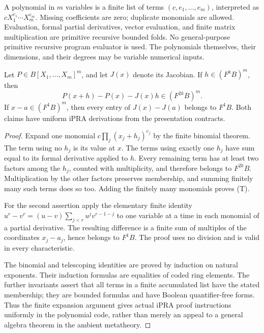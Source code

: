 A polynomial in $m$ variables is a finite list of terms
$(c,e_1,\ldots,e_m)$, interpreted as
$cX_1^{e_1}\cdots X_m^{e_m}$.  Missing coefficients are zero; duplicate
monomials are allowed.  Evaluation, formal partial derivatives, vector
evaluation, and finite matrix multiplication are primitive recursive
bounded folds.  No general-purpose primitive recursive program evaluator
is used.  The polynomials themselves, their dimensions, and their degrees
may be variable numerical inputs.

\begin{lemma}
\label{lem:filtered-taylor}
Let $P\in B[X_1,\ldots,X_m]^m$, and let $J(x)$ denote its Jacobian.
If $h\in(F^kB)^m$, then
\[
 P(x+h)-P(x)-J(x)h\in(F^{2k}B)^m.                 \tag{T}
\]
If $x-a\in(F^1B)^m$, then every entry of $J(x)-J(a)$ belongs to $F^1B$.
Both claims have uniform iPRA derivations from the presentation contracts.
\end{lemma}

\begin{proof}
Expand one monomial
$c\prod_j(x_j+h_j)^{e_j}$ by the finite binomial theorem.  The term using
no $h_j$ is its value at $x$.  The terms using exactly one $h_j$ have sum
equal to its formal derivative applied to $h$.  Every remaining term has
at least two factors among the $h_j$, counted with multiplicity, and
therefore belongs to $F^{2k}B$.  Multiplication by the other factors
preserves membership, and summing finitely many such terms does so too.
Adding the finitely many monomials proves (T).

For the second assertion apply the elementary finite identity
$u^r-v^r=(u-v)\sum_{j<r}u^jv^{r-1-j}$ to one variable at a time in
each monomial of a partial derivative.  The resulting difference is a
finite sum of multiples of the coordinates $x_j-a_j$, hence belongs to
$F^1B$.  The proof uses no division and is valid in every characteristic.

The binomial and telescoping identities are proved by induction on natural
exponents.  Their induction formulas are equalities of coded ring elements.
The further invariants assert that all terms in a finite accumulated list
have the stated membership; they are bounded formulas and have Boolean
quantifier-free forms.  Thus the finite expansion argument gives actual
iPRA proof instructions uniformly in the polynomial code, rather than
merely an appeal to a general algebra theorem in the ambient metatheory.
\end{proof}

